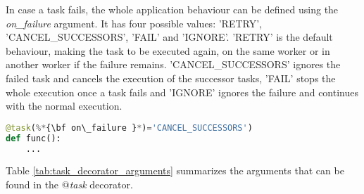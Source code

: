 In case a task fails, the whole application behaviour can be defined using the {\it on\_failure} argument. It has 
four possible values: 'RETRY', 'CANCEL\_SUCCESSORS', 'FAIL' and 'IGNORE'. 'RETRY' is the default behaviour, 
making the task to be executed again, on the same worker or in another worker if the failure remains. 
'CANCEL\_SUCCESSORS' ignores the failed task and cancels the execution of the successor tasks, 'FAIL' stops the whole execution once a task fails and 
'IGNORE' ignores the failure and continues with the normal execution.

\vspace{-0.1cm}

\begin{lstlisting}[language=python]
@task(%*{\bf on\_failure }*)='CANCEL_SUCCESSORS')
def func():
    ...
\end{lstlisting}

Table \ref{tab:task_decorator_arguments} summarizes the arguments that can be found in the {\it $@$task} decorator.

